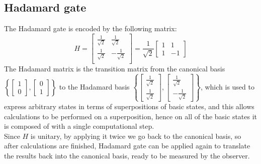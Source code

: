 \documentclass[12pt,a4paper]{report}
\theoremstyle{definition}
\theoremstyle{definition}
\theoremstyle{definition}
\begin{document}
\subsection{Hadamard gate}
The Hadamard gate is encoded by the following matrix:
\begin{equation*}
    H=\begin{bmatrix}
        \frac{1}{\sqrt{2}} & \frac{1}{\sqrt{2}} \\
        \frac{1}{\sqrt{2}} & -\frac{1}{\sqrt{2}} \\
    \end{bmatrix}=\frac{1}{\sqrt{2}}\begin{bmatrix}
        1 & 1 \\
        1 & -1
    \end{bmatrix}
\end{equation*}
The Hadamard matrix is the transition matrix from the canonical basis $\left\{\begin{bmatrix} 1 \\ 0\end{bmatrix}, \begin{bmatrix} 0 \\ 1\end{bmatrix}\right\}$ to the Hadamard basis $\left\{\begin{bmatrix} \frac{1}{\sqrt{2}} \\ \frac{1}{\sqrt{2}}\end{bmatrix}, \begin{bmatrix} \frac{1}{\sqrt{2}} \\ -\frac{1}{\sqrt{2}}\end{bmatrix}\right\}$, which is used to express arbitrary states in terms of superpositions of basic states, and this allows calculations to be performed on a superposition, hence on all of the basic states it is composed of with a single computational step.\\
Since $H$ is unitary, by applying it twice we go back to the canonical basis, so after calculations are finished, Hadamard gate can be applied again to translate the results back into the canonical basis, ready to be measured by the observer.
\end{document}
